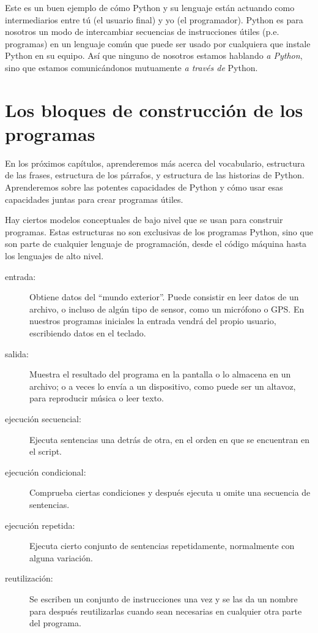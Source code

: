 Este es un buen ejemplo de cómo Python y su lenguaje están actuando como
intermediarios entre tú (el usuario final) y yo (el programador). Python es para nosotros
un modo de intercambiar secuencias de instrucciones útiles (p.e. programas) en un
lenguaje común que puede ser usado por cualquiera que instale
Python en su equipo. Así que ninguno de nosotros estamos hablando {\em a Python},
sino que estamos comunicándonos mutuamente {\em a través de} Python.

\section{Los bloques de construcción de los programas}

En los próximos capítulos, aprenderemos más acerca del vocabulario, estructura de las
frases, estructura de los párrafos, y estructura de las historias de Python. Aprenderemos
sobre las potentes capacidades de Python y cómo usar esas capacidades juntas para crear
programas útiles.

Hay ciertos modelos conceptuales de bajo nivel que se usan para construir programas.
Estas estructuras no son exclusivas de los programas Python, sino que son parte de
cualquier lenguaje de programación, desde el código máquina hasta los lenguajes de alto
nivel.

\begin{description}

\item[entrada:] Obtiene datos del ``mundo exterior''. Puede consistir en
leer datos de un archivo, o incluso de algún tipo de sensor, como un micrófono
o GPS. En nuestros programas iniciales la entrada vendrá del propio usuario,
escribiendo datos en el teclado.

\item[salida:] Muestra el resultado del programa en la pantalla
o lo almacena en un archivo; o a veces lo envía a un dispositivo, como puede ser
un altavoz, para reproducir música o leer texto.

\item[ejecución secuencial:] Ejecuta sentencias una detrás de otra,
en el orden en que se encuentran en el script.

\item[ejecución condicional:] Comprueba ciertas condiciones y
después ejecuta u omite una secuencia de sentencias.

\item[ejecución repetida:] Ejecuta cierto conjunto de sentencias
repetidamente, normalmente con alguna variación.

\item[reutilización:] Se escriben un conjunto de instrucciones una vez y se las da un nombre
para después reutilizarlas cuando sean necesarias en cualquier otra parte
del programa.

\end{description}

